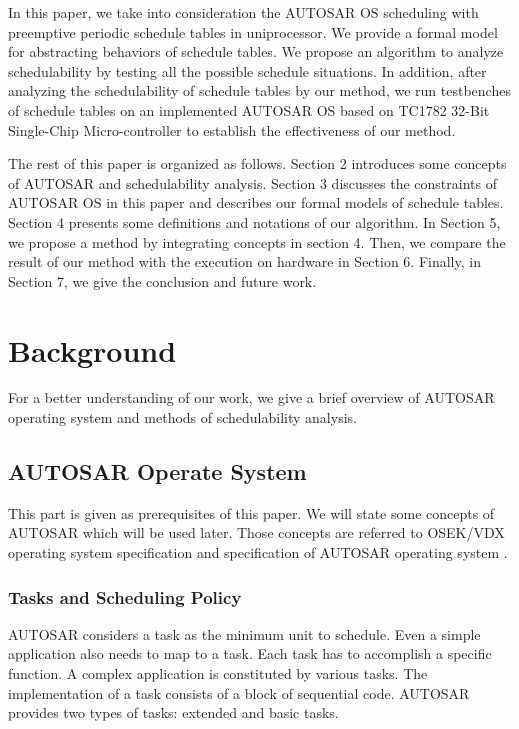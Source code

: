 \documentclass[10pt,conference]{IEEEtran}
\begin{document}
In this paper, we take into consideration the AUTOSAR OS scheduling with preemptive periodic schedule tables in uniprocessor. We provide a formal model for abstracting behaviors of schedule tables. We propose an algorithm to analyze schedulability by testing all the possible schedule situations. In addition, after analyzing the schedulability of schedule tables by our method, we run testbenches of schedule tables on an implemented AUTOSAR OS based on TC1782 32-Bit Single-Chip Micro-controller \cite{infineon.org} to establish the effectiveness of our method.

The rest of this paper is organized as follows. Section 2 introduces some concepts of AUTOSAR and schedulability analysis. Section 3 discusses the constraints of AUTOSAR OS in this paper and describes our formal models of schedule tables. Section 4 presents some definitions and notations of our algorithm. In Section 5, we propose a method by integrating concepts in section 4. Then, we compare the result of our method with the execution on hardware in Section 6. Finally, in Section 7, we give the conclusion and future work.

\section{Background}
For a better understanding of our work, we give a brief overview of AUTOSAR operating system and methods of schedulability analysis.
\subsection{AUTOSAR Operate System}
This part is given as prerequisites of this paper. We will state some concepts of AUTOSAR which will be used later. Those concepts are referred to OSEK/VDX operating system specification \cite{osek} and specification of AUTOSAR operating system \cite{autosar}.
\subsubsection{Tasks and Scheduling Policy}
AUTOSAR considers a task as the minimum unit to schedule. Even a simple application also needs to map to a task. Each task has to accomplish a specific function. A complex application is constituted by various tasks. The implementation of a task consists of a block of sequential code. AUTOSAR provides two types of tasks: extended and basic tasks.
\end{document}
